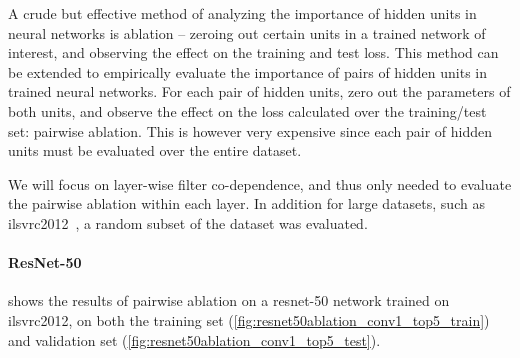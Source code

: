 \documentclass[thesis]{subfiles}
\begin{document}
A crude but effective method of analyzing the importance of hidden units in neural networks is ablation -- zeroing out certain units in a trained network of interest, and observing the effect on the training and test loss. This method can be extended to empirically evaluate the importance of pairs of hidden units in trained neural networks. For each pair of hidden units, zero out the parameters of both units, and observe the effect on the loss calculated over the training/test set: pairwise ablation. This is however very expensive since each pair of hidden units must be evaluated over the entire dataset.

We will focus on layer-wise filter co-dependence, and thus only needed to evaluate the pairwise ablation within each layer. In addition for large datasets, such as \gls{ilsvrc}2012~\citep{ILSVRC2015}, a random subset of the dataset was evaluated.

\paragraph{ResNet-50}
 shows the results of pairwise ablation on a \gls{resnet}-50 \citet{He2015} network trained on \gls{ilsvrc}2012, on both the training set (\cref{fig:resnet50ablation_conv1_top5_train}) and validation set (\cref{fig:resnet50ablation_conv1_top5_test}).
\end{document}
